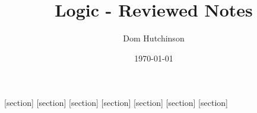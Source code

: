 \documentclass[11pt,a4paper]{article}
\begin{document}
\pagestyle{fancy}
\setlength\parindent{0pt}
\allowdisplaybreaks

\renewcommand{\headrulewidth}{0pt}


\title{Logic - Reviewed Notes}
\author{Dom Hutchinson}
\date{\today}
\maketitle

\fancyhead[R]{\today}

[section]
[section]
[section]
[section]
[section]
[section]
[section]

\newcommand{\dotprod}[0]{\boldsymbol{\cdot}}
\newcommand{\cosech}[0]{\mathrm{cosech}\ }
\newcommand{\cosec}[0]{\mathrm{cosec}\ }
\newcommand{\sech}[0]{\mathrm{sech}\ }
\newcommand{\prob}[0]{\mathbb{P}}
\newcommand{\nats}[0]{\mathbb{N}}
\newcommand{\cov}[0]{\mathrm{Cov}}
\newcommand{\var}[0]{\mathrm{Var}}
\newcommand{\expect}[0]{\mathbb{E}}
\newcommand{\reals}[0]{\mathbb{R}}
\newcommand{\integers}[0]{\mathbb{Z}}
\newcommand{\indicator}[0]{\mathds{1}}
\newcommand{\nb}[0]{\textit{N.B.} }
\newcommand{\ie}[0]{\textit{i.e.} }
\newcommand{\eg}[0]{\textit{e.g.} }
\newcommand{\X}[0]{\textbf{X}}
\newcommand{\x}[0]{\textbf{x}}
\newcommand{\iid}[0]{\overset{\text{iid}}{\sim}}
\newcommand{\proved}[0]{$\hfill\square$\\}
\newcommand{\LL}[0]{\mathcal{L}}
\newcommand{\M}[0]{\mathfrak{M}}
\newcommand{\I}[0]{\mathfrak{I}}
\end{document}
